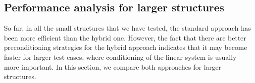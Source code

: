 %


\subsection*{\sffamily \large Performance analysis for larger structures}

So far, in all the small structures that we have tested, the standard approach has been more efficient than the hybrid one.
However, the fact that there are better preconditioning strategies for the hybrid approach indicates that it may become faster for larger test cases, where conditioning of the linear system is usually more important. 
In this section, we compare both approaches for larger structures.
